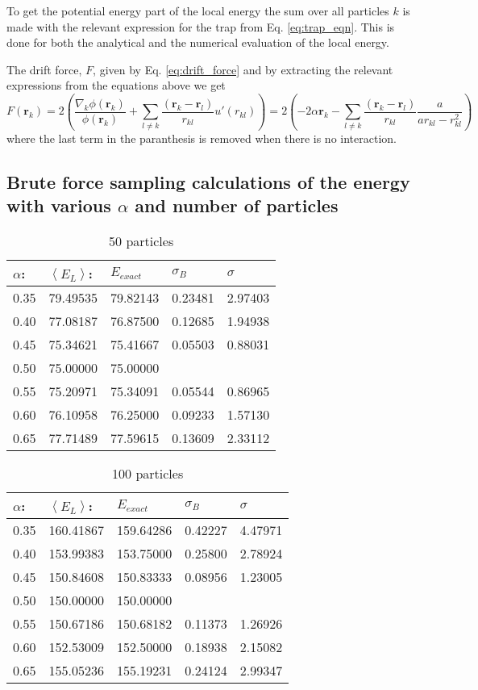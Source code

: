 To get the potential energy part of the local energy the sum over all particles $k$ is made with the relevant expression for the trap from Eq. \ref{eq:trap_eqn}. This is done for both the analytical and the numerical evaluation of the local energy.

The drift force, $F$, given by Eq. \ref{eq:drift_force} and by extracting the relevant expressions from the equations above we get
$$ F(\mathbf{r}_k) = 2\left(\frac{\nabla_k\phi(\mathbf{r}_k)}{\phi(\mathbf{r}_k)}
   +\sum_{l\ne k}\frac{(\mathbf{r}_k-\mathbf{r}_l)}{r_{kl}}u'(r_{kl})\right) = 2 \left( -2\alpha  \mathbf{r}_k  - \sum_{l\ne k}\frac{(\mathbf{r}_k-\mathbf{r}_l)}{r_{kl}}\frac{a}{ar_{kl}-r_{kl}^2}\right) $$ 
where the last term in the paranthesis is removed when there is no interaction.


\subsection{Brute force sampling calculations of the energy with various $\alpha$ and number of particles}\label{app:alpha_lists_brute_force}

\begin{table}[H]\caption{50 particles}\label{tab:brute_force_N_50}
\begin{tabular}{lllll}
$\alpha$: & $\left< E_L \right>$:& $E_{exact}$ & $\sigma_B$ & $\sigma$\\ \hline
0.35 & 79.49535 & 79.82143 & 0.23481 & 2.97403\\
0.40 & 77.08187 & 76.87500 & 0.12685 & 1.94938\\
0.45 & 75.34621 & 75.41667 & 0.05503 & 0.88031\\
0.50 & 75.00000 & 75.00000 &                &                \\ 
0.55 & 75.20971 & 75.34091 & 0.05544 & 0.86965\\
0.60 & 76.10958 & 76.25000 & 0.09233 & 1.57130\\
0.65 & 77.71489 & 77.59615 & 0.13609 & 2.33112\\
\end{tabular}
\end{table} 

\begin{table}[H]\caption{100 particles}\label{tab:brute_force_N_100}
\begin{tabular}{lllll}
$\alpha$: & $\left< E_L \right>$:& $E_{exact}$ & $\sigma_B$ & $\sigma$\\ \hline
0.35 & 160.41867 & 159.64286 & 0.42227 & 4.47971\\
0.40 & 153.99383 & 153.75000 & 0.25800 & 2.78924\\
0.45 & 150.84608 & 150.83333 & 0.08956 & 1.23005\\
0.50 & 150.00000 & 150.00000 &                 &                \\ 
0.55 & 150.67186 & 150.68182 & 0.11373 & 1.26926\\
0.60 & 152.53009 & 152.50000 & 0.18938 & 2.15082\\
0.65 & 155.05236 & 155.19231 & 0.24124 & 2.99347\\
\end{tabular}
\end{table} 

